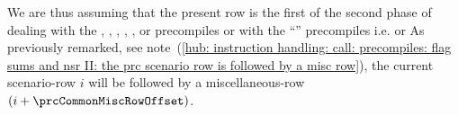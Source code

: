 \begin{center}
\end{center}
We are thus assuming that the present row is the first of the second phase of dealing with the 
\instEcrecover{},
\instShaTwo{},
\instRipemd{},
\instIdentity{},
\instEcadd{},
\instEcmul{} or
\instEcpairing{}
precompiles or with the ``\blsDataMod{}'' precompiles i.e.
\instPointEvaluation{}
\instBlsGOneAdd{}
\instBlsGOneMsm{}
\instBlsGTwoAdd{}
\instBlsGTwoMsm{}
\instBlsPairingCheck{}
\instBlsMapFpToGOne{} or
\instBlsMapFpTwoToGTwo{}
As previously remarked,
see note~(\ref{hub: instruction handling: call: precompiles: flag sums and nsr II: the prc scenario row is followed by a misc row}),
the current scenario-row $i$ will be followed by a miscellaneous-row $(i + \prcCommonMiscRowOffset)$.
